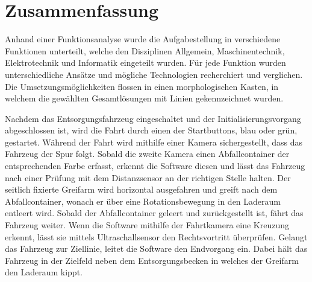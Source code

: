 \newpage
\section*{Zusammenfassung}
Anhand einer Funktionsanalyse wurde die Aufgabestellung in verschiedene Funktionen unterteilt, welche den Disziplinen Allgemein, Maschinentechnik, Elektrotechnik und Informatik eingeteilt wurden. Für jede Funktion wurden unterschiedliche Ansätze und mögliche Technologien recherchiert und verglichen.
Die Umsetzungsmöglichkeiten flossen in einen morphologischen Kasten, in welchem die gewählten Gesamtlösungen mit Linien gekennzeichnet wurden.\newline

Nachdem das Entsorgungsfahrzeug eingeschaltet und der Initialisierungsvorgang abgeschlossen ist, wird die Fahrt durch einen der Startbuttons, blau oder grün, gestartet. Während der Fahrt wird mithilfe einer Kamera sichergestellt, dass das Fahrzeug der Spur folgt. Sobald die zweite Kamera einen Abfallcontainer der entsprechenden Farbe erfasst, erkennt die Software diesen und lässt das Fahrzeug nach einer Prüfung mit dem Distanzsensor an der richtigen Stelle halten. Der seitlich fixierte Greifarm wird horizontal ausgefahren und greift nach dem Abfallcontainer, wonach er über eine Rotationsbewegung in den Laderaum entleert wird. Sobald der Abfallcontainer geleert und zurückgestellt ist, fährt das Fahrzeug weiter. Wenn die Software mithilfe der Fahrtkamera eine Kreuzung erkennt, lässt sie mittels Ultraschallsensor den Rechtsvortritt überprüfen. Gelangt das Fahrzeug zur Ziellinie, leitet die Software den Endvorgang ein. Dabei hält das Fahrzeug in der Zielfeld neben dem Entsorgungsbecken in welches der Greifarm den Laderaum kippt.\newline